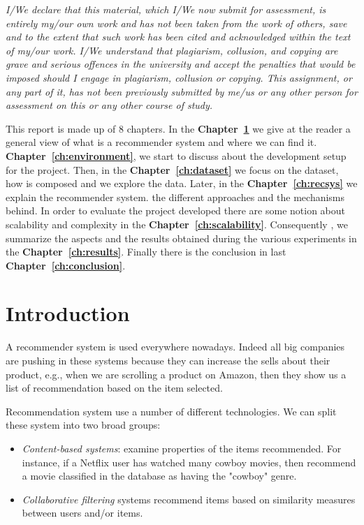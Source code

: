\documentclass[12pt,english]{report}
\begin{document}
\frontespizio
{\raggedleft \large \sl \textit{I/We declare that this material, which I/We now submit for assessment, is entirely my/our own work and has not been taken from the work of others, save and to the extent that such work has been cited and acknowledged within the text of my/our work. I/We understand that plagiarism, collusion, and copying are grave and serious offences in the university and accept the penalties that would be imposed should I engage in plagiarism, collusion or copying. This assignment, or any part of it, has not been previously submitted by me/us or any other person for assessment on this or any other course of study.} \\}


\afterpreface

This report is made up of 8 chapters. In the \textbf{Chapter~\ref{ch:introduction}} we give at the reader a general view of what is a recommender system and where we can find it.
\textbf{Chapter~\ref{ch:environment}}, we start to discuss about the development setup for the project. Then, in the \textbf{Chapter~\ref{ch:dataset}} we focus on the dataset, how is composed and we explore the data. Later, in the \textbf{Chapter~\ref{ch:recsys}} we explain the recommender system. the different approaches and the mechanisms behind. In order to evaluate the project developed there are some notion about scalability and complexity in the \textbf{Chapter~\ref{ch:scalability}}. Consequently , we summarize the aspects and the results obtained during the various experiments in the \textbf{Chapter~\ref{ch:results}}. Finally there is the conclusion in last \textbf{Chapter~\ref{ch:conclusion}}.

\chapter{Introduction}\label{ch:introduction}
A recommender system is used everywhere nowadays. Indeed all big companies are pushing in these systems because they can increase the sells about their product, e.g., when we are scrolling a product on Amazon, then they show us a list of recommendation based on the item selected.\par

Recommendation system use a number of different technologies. We can split these system into two broad groups: \cite{rajaraman2014mining}
\begin{itemize}
\item \textit{Content-based systems}: examine properties of the items recommended. For instance, if a Netflix user has watched many cowboy movies, then recommend a movie classified in the database as having the "cowboy" genre.
\item \textit{Collaborative filtering} systems recommend items based on similarity measures between users and/or items.
\end{itemize}
\end{document}
